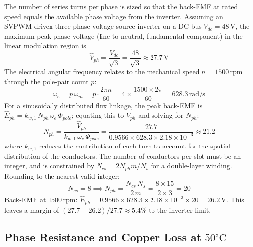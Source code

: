 \documentclass[12pt,a4paper]{article}
\newcommand{\unit}[1]{\ensuremath{\,\mathrm{#1}}}
\newcommand{\degree}{\ensuremath{^{\circ}}}
\begin{document}
The number of series turns per phase is sized so that the back-EMF at
rated speed equals the available phase voltage from the inverter.
Assuming an SVPWM-driven three-phase voltage-source inverter on a DC
bus $V_{dc} = 48\unit{V}$, the maximum peak phase voltage
(line-to-neutral, fundamental component) in the linear modulation
region is
\begin{equation}
  \hat{V}_{ph} = \frac{V_{dc}}{\sqrt{3}}
              = \frac{48}{\sqrt{3}} \approx 27.7\unit{V}
\end{equation}
The electrical angular frequency relates to the mechanical speed
$n = 1500\unit{rpm}$ through the pole-pair count $p$:
\begin{equation}
  \omega_e = p\,\omega_m = p \cdot \frac{2\pi n}{60}
           = 4 \times \frac{1500 \times 2\pi}{60}
           = 628.3\unit{rad/s}
\end{equation}
For a sinusoidally distributed flux linkage, the peak back-EMF is
$\hat{E}_{ph} = k_{w,1}\,N_{ph}\,\omega_e\,\Phi_{pole}$; equating this to
$\hat{V}_{ph}$ and solving for $N_{ph}$:
\begin{equation}
  N_{ph} = \frac{\hat{V}_{ph}}{k_{w,1}\,\omega_e\,\Phi_{pole}}
         = \frac{27.7}{0.9566 \times 628.3 \times 2.18\times10^{-3}}
         \approx 21.2
\end{equation}
where $k_{w,1}$ reduces the contribution of each turn to account for the
spatial distribution of the conductors.
The number of conductors per slot must be an integer, and is constrained
by $N_{cs} = 2 N_{ph} m / N_s$ for a double-layer winding.
Rounding to the nearest valid integer:
\begin{equation}
  N_{cs} = 8 \implies N_{ph} = \frac{N_{cs}\,N_s}{2\,m}
                              = \frac{8 \times 15}{2 \times 3} = 20
\end{equation}
Back-EMF at 1500\unit{rpm}:
$\hat{E}_{ph} = 0.9566 \times 628.3 \times 2.18\times10^{-3} \times 20
             = 26.2\unit{V}$.
This leaves a margin of
$(27.7-26.2)/27.7 \approx 5.4\%$ to the inverter limit.

\subsection{Phase Resistance and Copper Loss at \texorpdfstring{$50\degree\text{C}$}{50C}}
\end{document}
